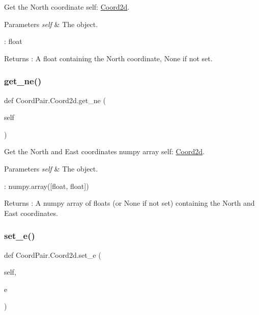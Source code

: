 Get the North coordinate  self\+: \hyperlink{classCoordPair_1_1Coord2d}{Coord2d}. 


\begin{DoxyParams}{Parameters}
{\em self} & The object.\\
\hline
\end{DoxyParams}
\+: float \begin{DoxyReturn}{Returns}
\+: A float containing the North coordinate, None if not set. 
\end{DoxyReturn}
\mbox{\label{classCoordPair_1_1Coord2d_a0e41450dc42ec29ab58a9f849a303baa}} 
\subsubsection{\texorpdfstring{get\+\_\+ne()}{get\_ne()}}
{\footnotesize\ttfamily def Coord\+Pair.\+Coord2d.\+get\+\_\+ne (\begin{DoxyParamCaption}\item[{}]{self }\end{DoxyParamCaption})}



Get the North and East coordinates numpy array  self\+: \hyperlink{classCoordPair_1_1Coord2d}{Coord2d}. 


\begin{DoxyParams}{Parameters}
{\em self} & The object.\\
\hline
\end{DoxyParams}
\+: numpy.\+array(\mbox{[}float, float\mbox{]}) \begin{DoxyReturn}{Returns}
\+: A numpy array of floats (or None if not set) containing the North and East coordinates. 
\end{DoxyReturn}
\mbox{\label{classCoordPair_1_1Coord2d_a7f4d5d5ab2c2f76d6b226a77f90cfa14}} 
\subsubsection{\texorpdfstring{set\+\_\+e()}{set\_e()}}
{\footnotesize\ttfamily def Coord\+Pair.\+Coord2d.\+set\+\_\+e (\begin{DoxyParamCaption}\item[{}]{self,  }\item[{}]{e }\end{DoxyParamCaption})}



